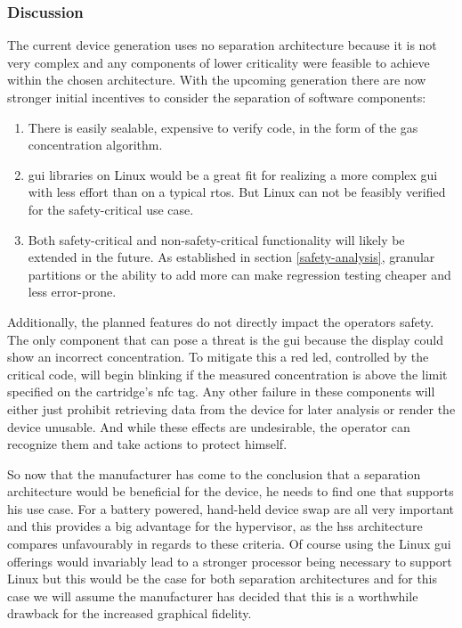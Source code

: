 \subsubsection{Discussion}
The current device generation uses no separation architecture because it is not very complex and any components of lower criticality were feasible to achieve within the chosen architecture. With the upcoming generation there are now stronger initial incentives to consider the separation of software components:
\begin{enumerate}
\item There is easily sealable, expensive to verify code, in the form of the gas concentration algorithm.
\item \acrshort{gui} libraries on Linux would be a great fit for realizing a more complex \acrshort{gui} with less effort than on a typical \acrshort{rtos}. But Linux can not be feasibly verified for the safety-critical use case.
\item Both safety-critical and non-safety-critical functionality will likely be extended in the future. As established in section  \ref{safety-analysis}, granular partitions or the ability to add more can make regression testing cheaper and less error-prone.
\end{enumerate}
Additionally, the planned features do not directly impact the operators safety. The only component that can pose a threat is the \acrshort{gui} because the display could show an incorrect concentration. To mitigate this a red \acrshort{led}, controlled by the critical code, will begin blinking if the measured concentration is above the limit specified on the cartridge's \acrshort{nfc} tag. Any other failure in these components will either just prohibit retrieving data from the device for later analysis or render the device unusable. And while these effects are undesirable, the operator can recognize them and take actions to protect himself.

So now that the manufacturer has come to the conclusion that a separation architecture would be beneficial for the device, he needs to find one that supports his use case. For a battery powered, hand-held device \acrfull{swap} are all very important and this provides a big advantage for the hypervisor, as the \acrshort{hss} architecture compares unfavourably in regards to these criteria. Of course using the Linux \acrshort{gui} offerings would invariably lead to a stronger processor being necessary to support Linux but this would be the case for both separation architectures and for this case we will assume the manufacturer has decided that this is a worthwhile drawback for the increased graphical fidelity. 

